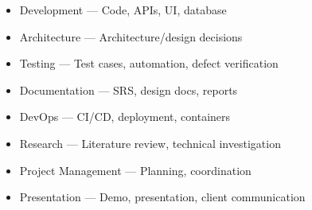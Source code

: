 \documentclass[11pt,a4paper]{article}
\begin{document}
\begin{itemize}
\begin{itemize}
        \item Development —	Code, APIs, UI, database
        \item Architecture — Architecture/design decisions
        \item Testing — Test cases, automation, defect verification
        \item Documentation — SRS, design docs, reports
        \item DevOps — CI/CD, deployment, containers
        \item Research — Literature review, technical investigation
        \item Project Management — Planning, coordination
        \item Presentation — Demo, presentation, client communication 
    \end{itemize}

\end{itemize}
\end{document}
